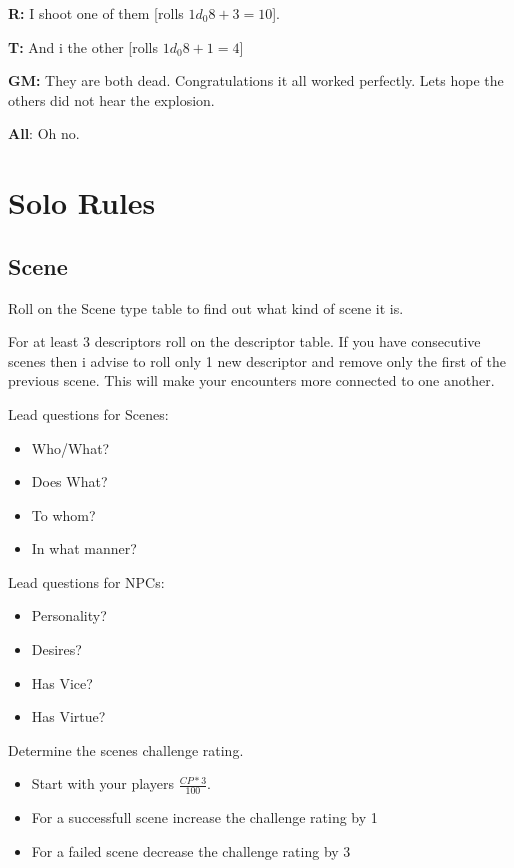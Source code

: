 \documentclass[11pt]{article}
\begin{document}
{\textbf{R:} I shoot one of them [rolls \(1 d_0 8 + 3 = 10\)].

\textbf{T:} And i the other [rolls \(1 d_0 8 + 1 = 4\)]

\textbf{GM:} They are both dead. Congratulations it all worked perfectly. Lets hope the others did not hear the explosion.

\textbf{All}: Oh no.


\newpage

\section{Solo Rules}
\label{sec:orgf0fc246}

\subsection{Scene}
\label{sec:org6b3c505}
Roll on the Scene type table to find out what kind of scene it is.

For at least 3 descriptors roll on the descriptor table. If you have consecutive scenes then i advise to roll only 1 new descriptor and remove only the first of the previous scene. This will make your encounters more connected to one another.

\begin{multicols}{2}
Lead questions for Scenes: 
\begin{itemize}
\item Who/What?
\item Does What?
\item To whom?
\item In what manner?
\end{itemize}
\columnbreak
Lead questions for NPCs:
\begin{itemize}
\item Personality?
\item Desires?
\item Has Vice?
\item Has Virtue?
\end{itemize}
\end{multicols}

Determine the scenes challenge rating.
\begin{itemize}
\item Start with your players \(\frac{CP * 3}{100}\).
\item For a successfull scene increase the challenge rating by 1
\item For a failed scene decrease the challenge rating by 3
\end{itemize}

}
\end{document}
